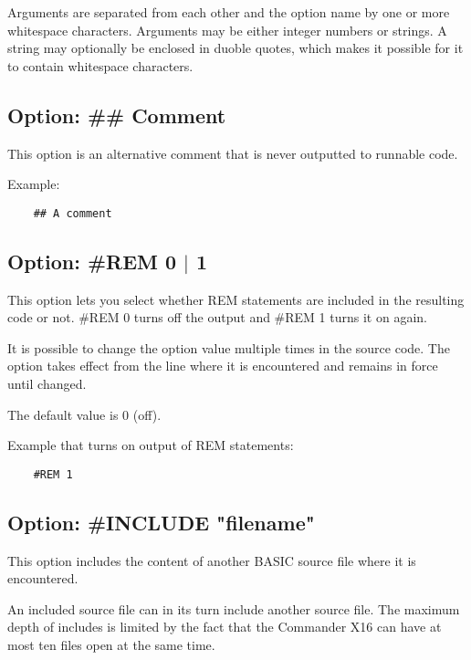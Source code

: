 \documentclass{article}
\begin{document}
        Arguments are separated from each other and the option name by one or more whitespace characters.
        Arguments may be either integer numbers or strings. A string may optionally be enclosed in
        duoble quotes, which makes it possible for it to contain whitespace characters.

    \subsection{Option: \#\# Comment}

        This option is an alternative comment that is never outputted to runnable
        code.

        Example:

        \begin{verbatim}
    ## A comment
        \end{verbatim}

    \subsection{Option: \#REM 0 $|$ 1}

        This option lets you select whether REM statements are included in
        the resulting code or not. \#REM 0 turns off the output and \#REM 1
        turns it on again.

        It is possible to change the option value multiple times in the
        source code. The option takes effect from the line where it is 
        encountered and remains in force until changed.

        The default value is 0 (off).

        Example that turns on output of REM statements:
        \begin{verbatim}
    #REM 1
        \end{verbatim}

    \subsection{Option: \#INCLUDE "filename"}

        This option includes the content of another BASIC source
        file where it is encountered.

        An included source file can in its turn include another
        source file. The maximum depth of includes is limited
        by the fact that the Commander X16 can have at most
        ten files open at the same time.
\end{document}
